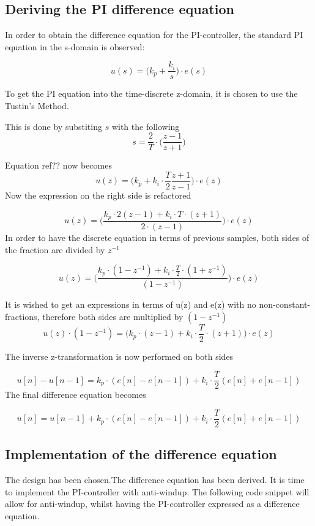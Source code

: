 \documentclass[../../../main]{subfiles}
\begin{document}
\subsection{Deriving the PI difference equation}

In order to obtain the difference equation for the PI-controller, the standard PI equation in the s-domain is observed:

\begin{equation}
  u(s) = \Bigg(k_p + \frac{k_i}{s} \Bigg) \cdot e(s)
\end{equation}


To get the PI equation into the time-discrete z-domain, it is chosen to use the Tustin's Method.

This is done by substiting $s$ with the following
$$
s = \frac{2}{T}\cdot \Bigg( \frac{z-1}{z+1}\Bigg)
$$

Equation ref??  now becomes
$$
  u(z) = \Bigg(k_p + k_i\cdot \frac{T}{2} \frac{z+1}{z-1} \Bigg) \cdot e(z)
$$
Now the expression on the right side is refactored

$$
  u(z) = \Bigg( \frac{k_p \cdot 2(z-1) + k_i \cdot T \cdot (z+1)}{2\cdot (z-1)}\Bigg) \cdot e(z)
$$
In order to have the discrete equation in terms of previous samples, both sides of the fraction are divided by $z^{-1}$

$$
  u(z) = \Bigg( \frac{k_p \cdot(1-z^{-1}) + k_i \cdot \frac{T}{2} \cdot (1+z^{-1}) }{(1-z^{-1})}\Bigg) \cdot e(z)
$$

It is wished to get an expressions in terms of u(z) and e(z) with no non-constant-fractions, therefore both sides are multiplied by $(1 - z^{-1})$
$$
  u(z)\cdot(1 - z^{-1}) = \Bigg( k_p \cdot(z-1) + k_i \cdot \frac{T}{2} \cdot (z+1) \Bigg) \cdot e(z)
$$

The inverse z-transformation is now performed on both sides

$$
  u[n]-u[n-1] =  k_p \cdot (e[n] - e[n-1])  + k_i \cdot \frac{T}{2}(e[n] + e[n-1])
$$
The final difference equation becomes

$$
  u[n] = u[n-1] + k_p \cdot (e[n] - e[n-1])  + k_i \cdot \frac{T}{2}(e[n] + e[n-1])
$$



\subsection{Implementation of the difference equation}

The design has been chosen.The difference equation has been derived.
It is time to implement the PI-controller with anti-windup.
The following code snippet will allow for anti-windup, whilst having the PI-controller expressed as a difference equation.

\end{document}
